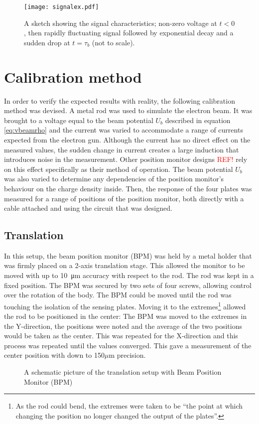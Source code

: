\begin{figure}[H]
\centering
%
\texttt{[image: signalex.pdf]}
\caption{A sketch showing the signal characteristics; non-zero voltage at $t<0$, then rapidly fluctuating signal followed by exponential decay and a sudden drop at $t=\tau_b$ (not to scale).}
\label{fig:signalex}
\end{figure}

\section{Calibration method}
In order to verify the expected results with reality, the following calibration method was devised. 
A metal rod was used to simulate the electron beam. It was brought to a voltage equal to the beam potential $U_b$ described in equation \ref{eq:vbeamrho} and the current was varied to accommodate a range of currents expected from the electron gun. Although the current has no direct effect on the measured values, the sudden change in current creates a large induction that introduces noise in the measurement. Other position monitor designs \textcolor{red}{REF!} rely on this effect specifically as their method of operation. 
The beam potential $U_b$ was also varied to determine any dependencies of the position monitor's behaviour on the charge density inside. Then, the response of the four plates was measured for a range of positions of the position monitor, both directly with a cable attached and using the circuit that was designed.

\subsection{Translation}
\label{sec:calibration/translation}
In this setup, the beam position monitor (BPM) was held by a metal holder that was firmly placed on a 2-axis translation stage. This allowed the monitor to be moved with up to \SI{10}{\micro\meter} accuracy with respect to the rod. The rod was kept in a fixed position.
The BPM was secured by two sets of four screws, allowing control over the rotation of the body. The BPM could be moved until the rod was touching the isolation of the sensing plates. Moving it to the extremes\footnote{As the rod could bend, the extremes were taken to be ``the point at which changing the position no longer changed the output of the plates''.} allowed the rod to be positioned in the center: 
The BPM was moved to the extremes in the Y-direction, the positions were noted and the average of the two positions would be taken as the center. This was repeated for the X-direction and this process was repeated until the values converged. This gave a measurement of the center position with down to 150$\mu$m precision.
\begin{figure}[H]
\centering

\caption{A schematic picture of the translation setup with Beam Position Monitor (BPM)}
\label{fig:schem_translation}
\end{figure}


